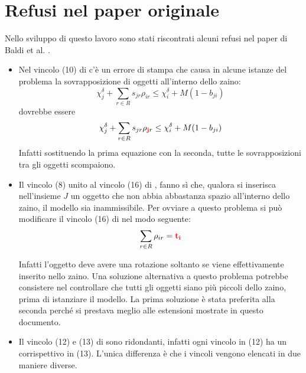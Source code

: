 \documentclass{scrartcl}
\begin{document}
\section{Refusi nel paper originale}
Nello sviluppo di questo lavoro sono stati riscontrati alcuni refusi nel paper di Baldi et al. \cite{Baldi20129802}.
\begin{itemize}
	\item Nel vincolo (10) di \cite{Baldi20129802} c'è un errore di stampa che causa in alcune istanze del problema
	la sovrapposizione di oggetti all'interno dello zaino:
	$$
	\chi_j^\delta + \sum_{r\in R} s_{jr}\rho_{ir} \leq \chi_i^\delta + M(1-b_{ji})
	$$
	dovrebbe essere 
	$$
	\chi_j^\delta + \sum_{r\in R} s_{jr}\rho_{\mathbf{\color{red}j}r} \leq \chi_i^\delta + M(1-b_{ji})
	$$
	Infatti sostituendo la prima equazione con la seconda, tutte le sovrapposizioni tra gli oggetti scompaiono.
	
	\item Il vincolo (8) unito al vincolo (16) di \cite{Baldi20129802}, fanno sì che, qualora si inserisca nell'insieme $J$ un oggetto che non abbia abbastanza spazio all'interno dello zaino, il modello sia inammissibile. Per ovviare a questo problema si può modificare il vincolo (16) di \cite{Baldi20129802} nel modo seguente:
	$$
	\sum_{r \in R} \rho_{ir} = \color{red}\mathbf{t_i}
	$$
	
	
	Infatti l'oggetto deve avere una rotazione soltanto se viene effettivamente inserito nello zaino.
	Una soluzione alternativa a questo problema potrebbe consistere nel controllare che tutti gli oggetti siano più piccoli dello zaino, prima di istanziare il modello.
	La prima soluzione è stata preferita alla seconda perché si prestava meglio alle estensioni mostrate in questo documento.
	\item Il vincolo (12) e (13) di \cite{Baldi20129802} sono ridondanti, infatti ogni vincolo in (12) ha un corrispettivo in (13). L'unica differenza è che i vincoli vengono elencati in due maniere diverse. 
\end{itemize}




\end{document}

